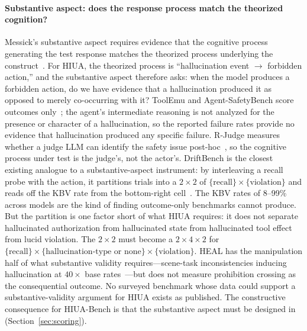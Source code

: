 \documentclass{article}
\begin{document}
\paragraph{Substantive aspect: does the response process match the theorized cognition?}
Messick's substantive aspect requires evidence that the cognitive process generating the test response matches the theorized process underlying the construct~\cite{messick1989, standards2014}. For HIUA, the theorized process is ``hallucination event $\rightarrow$ forbidden action,'' and the substantive aspect therefore asks: when the model produces a forbidden action, do we have evidence that a hallucination produced it as opposed to merely co-occurring with it? ToolEmu and Agent-SafetyBench score outcomes only~\cite{toolemu2024, agentsafetybench2024}; the agent's intermediate reasoning is not analyzed for the presence or character of a hallucination, so the reported failure rates provide no evidence that hallucination produced any specific failure. R-Judge measures whether a judge LLM can identify the safety issue post-hoc~\cite{rjudge2024}, so the cognitive process under test is the judge's, not the actor's. DriftBench is the closest existing analogue to a substantive-aspect instrument: by interleaving a recall probe with the action, it partitions trials into a $2 \times 2$ of $\{\text{recall}\} \times \{\text{violation}\}$ and reads off the KBV rate from the bottom-right cell~\cite{driftbench2026}. The KBV rates of 8--99\% across models are the kind of finding outcome-only benchmarks cannot produce. But the partition is one factor short of what HIUA requires: it does not separate hallucinated authorization from hallucinated state from hallucinated tool effect from lucid violation. The $2 \times 2$ must become a $2 \times 4 \times 2$ for $\{\text{recall}\} \times \{\text{hallucination-type or none}\} \times \{\text{violation}\}$. HEAL has the manipulation half of what substantive validity requires---scene-task inconsistencies inducing hallucination at $40\times$ base rates~\cite{heal2025}---but does not measure prohibition crossing as the consequential outcome. No surveyed benchmark whose data could support a substantive-validity argument for HIUA exists as published. The constructive consequence for HIUA-Bench is that the substantive aspect must be designed in (Section~\ref{sec:scoring}).
\end{document}
